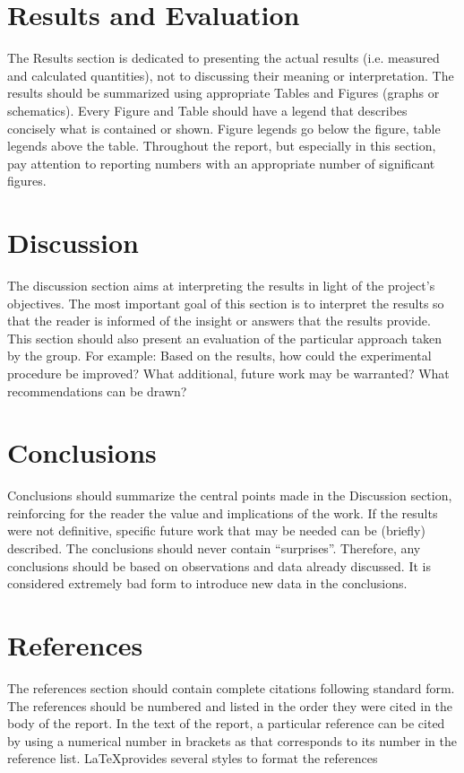 \section{Results and Evaluation}
The Results section is dedicated to presenting the actual results (i.e. measured and calculated quantities), not to discussing their meaning or interpretation. The results should be summarized using appropriate Tables and Figures (graphs or schematics). Every Figure and Table should have a legend that describes concisely what is contained or shown. Figure legends go below the figure, table legends above the table. Throughout the report, but especially in this section, pay attention to reporting numbers with an appropriate number of significant figures. 

\section{Discussion}
The discussion section aims at interpreting the results in light of the project's objectives. The most important goal of this section is to interpret the results so that the reader is informed of the insight or answers that the results provide. This section should also present an evaluation of the particular approach taken by the group. For example: Based on the results, how could the experimental procedure be improved? What additional, future work may be warranted? What recommendations can be drawn?


\section{Conclusions}
Conclusions should summarize the central points made in the Discussion section, reinforcing for the reader the value and implications of the work. If the results were not definitive, specific future work that may be needed can be (briefly) described. The conclusions should never contain ``surprises''. Therefore, any conclusions should be based on observations and data already discussed. It is considered extremely bad form to introduce new data in the conclusions.

\section*{References}

The references section should contain complete citations following standard form.  The references should be numbered and listed in the order they were cited in the body of the report. In the text of the report, a particular reference can be cited by using a numerical number in brackets as \cite{Lee2015} that corresponds to its number in the reference list. \LaTeX provides several styles to format the references




